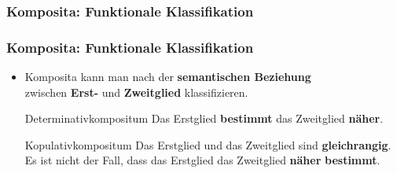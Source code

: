 \subsubsection{Komposita: Funktionale Klassifikation}


\begin{frame}
\frametitle{Komposita: Funktionale Klassifikation}

\begin{itemize}
	\item Komposita kann man nach der \textbf{semantischen Beziehung} \\
	zwischen \textbf{Erst-} und \textbf{Zweitglied} klassifizieren.
	
	\begin{block}{Determinativkompositum}
		Das Erstglied \textbf{bestimmt} das Zweitglied \textbf{näher}. 
	\end{block}
	
	\settowidth{}

	 
	
	\z 

\pause 
	
	\begin{block}{Kopulativkompositum}
		Das Erstglied und das Zweitglied sind \textbf{gleichrangig}.\\
		Es ist nicht der Fall, dass das Erstglied  das Zweitglied \textbf{näher} \textbf{bestimmt}. 
	\end{block}
	
	 
	\z 
	
\end{itemize}

\end{frame}



